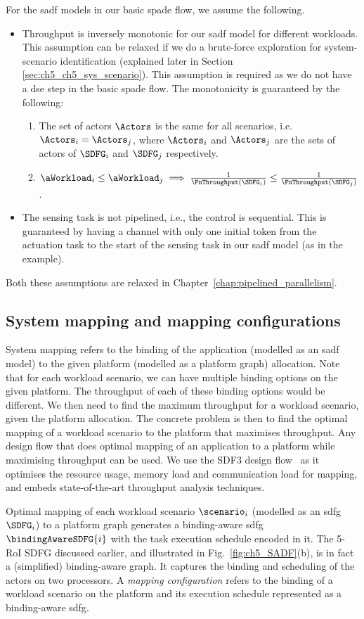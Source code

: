 \vspace{1ex}
For the \gls{sadf} models in our basic \gls{spade} flow, we assume the following.
\vspace{-1ex}
\begin{itemize}
  \item Throughput is inversely monotonic for our \gls{sadf} model for different workloads. This assumption can be relaxed if we do a brute-force exploration for system-scenario identification (explained later in Section \ref{sec:ch5_ch5_sys_scenario}). This assumption is required as we do not have a \gls{dse} step in the basic \gls{spade} flow. The monotonicity is guaranteed by the following:
  \begin{enumerate}
      \item The set of actors $\Actors$ is the same for all scenarios, i.e. $\Actors_{i}=\Actors_{j}$, where $\Actors_{i}$ and $\Actors_{j}$ are the sets of actors of $\SDFG_i$ and $\SDFG_j$ respectively.
      \item $\aWorkload_i \leq \aWorkload_j \implies \frac{1}{\FnThroughput(\SDFG_i)} \leq \frac{1}{\FnThroughput(\SDFG_j)}$.
  \end{enumerate}
   \item The sensing task is not pipelined, i.e., the control is sequential. This is guaranteed by having a channel with only one initial token from the actuation task to the start of the sensing task in our \gls{sadf} model (as in the example).
\end{itemize}
 Both these assumptions are relaxed in Chapter~\ref{chap:pipelined_parallelism}. 

\subsection{System mapping and mapping configurations}
System mapping refers to the binding of the application (modelled as an \gls{sadf} model) to the given platform (modelled as a platform graph) allocation. 
Note that for each workload scenario, we can have multiple binding options on the given platform. The throughput of each of these binding options would be different.
We then need to find the maximum throughput for a workload scenario, given the platform allocation. 
The concrete problem is then to find the optimal mapping of a workload scenario to the platform that maximises throughput.
Any design flow that does optimal mapping of an application to a platform while maximising throughput can be used. We use the SDF3 design flow~\cite{stuijk2006sdf} as it optimises the resource usage, memory load and communication load for mapping, and embeds state-of-the-art throughput analysis techniques.

Optimal mapping of each workload scenario $\scenario_i$ (modelled as an \gls{sdfg} $\SDFG_i$) to a platform graph generates a binding-aware \gls{sdfg} $\bindingAwareSDFG{i}$ with the task execution schedule encoded in it. The 5-RoI SDFG discussed earlier, and illustrated in Fig.\ \ref{fig:ch5_SADF}(b), is in fact a (simplified) binding-aware graph. It captures the binding and scheduling of the actors on two processors. 
A \emph{mapping configuration} refers to the binding of a workload scenario on the platform and its execution schedule represented as a binding-aware \gls{sdfg}.